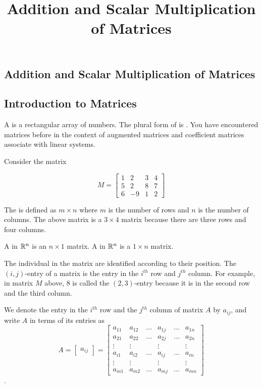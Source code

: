 \documentclass{ximera}
\title{Addition and Scalar Multiplication of Matrices} \license{CC BY-NC-SA 4.0}
\begin{document}
\begin{abstract}
\end{abstract}
\maketitle

\begin{onlineOnly}
\section*{Addition and Scalar Multiplication of Matrices}
\end{onlineOnly}

\subsection*{Introduction to Matrices}

A  is a rectangular array of numbers. The plural form of  is . You have encountered matrices before in the context of augmented matrices and coefficient matrices associate with linear systems.

Consider the matrix

$$M=\begin{bmatrix}
1 & 2 & 3 & 4 \\
5 & 2 & 8 & 7 \\
6 & -9 & 1 & 2
\end{bmatrix}$$

The  is defined as $m\times n$ where $m$ is the
number of rows and $n$ is the number of columns. The above matrix is a 
$3\times 4$ matrix because there are three rows and four columns.  

A  in $\mathbb{R}^n$ is an $n\times 1$ matrix.  A  in $\mathbb{R}^n$ is a $1\times n$ matrix.  

The individual  in the matrix are identified according to their position. The $( i, j)$-entry of a matrix is the entry 
in the $i^{th}$ row and $j^{th}$ column. For example, in matrix $M$ above,  $8$ is called the $(2,3)$-entry because it is in the second row and the third column. 

We denote the entry in the $i^{th}$ row  and the $j^{th}$ column of matrix $A$ by $a_{ij}$, and write $A$ in terms of its entries
as $$A= \begin{bmatrix} a_{ij} \end{bmatrix}=\begin{bmatrix}
           a_{11} & a_{12}&\dots&a_{1j}&\dots&a_{1n}\\
           a_{21}&a_{22} &\dots&a_{2j}&\dots &a_{2n}\\
		\vdots & \vdots&&\vdots&&\vdots\\
        a_{i1}&a_{i2}&\dots &a_{ij}&\dots &a_{in}\\
        \vdots & \vdots&&\vdots&&\vdots\\
		a_{m1}&a_{m2}&\dots &a_{mj}&\dots &a_{mn}
         \end{bmatrix}$$. 
\end{document}
